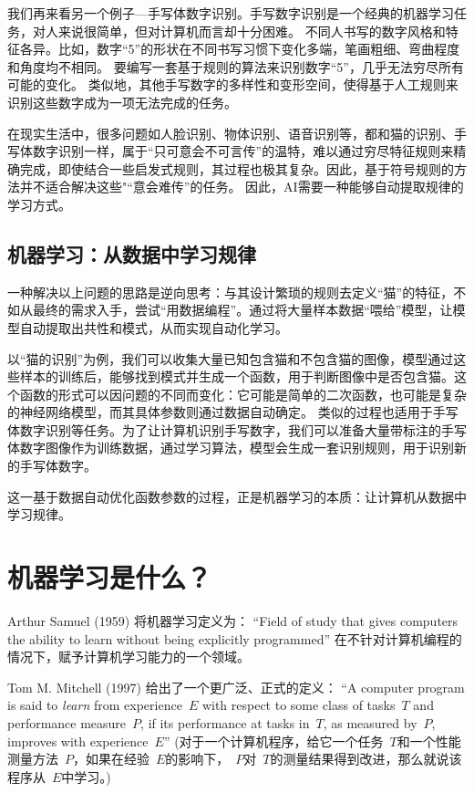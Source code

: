 我们再来看另一个例子---手写体数字识别。手写数字识别\cite{LeCun et al., 1998}是一个经典的机器学习任务，对人来说很简单，但对计算机而言却十分困难。
不同人书写的数字风格和特征各异。比如，数字“5”的形状在不同书写习惯下变化多端，笔画粗细、弯曲程度和角度均不相同。
要编写一套基于规则的算法来识别数字“5”，几乎无法穷尽所有可能的变化。
类似地，其他手写数字的多样性和变形空间，使得基于人工规则来识别这些数字成为一项无法完成的任务。

在现实生活中，很多问题如人脸识别、物体识别、语音识别等，都和猫的识别、手写体数字识别一样，属于“只可意会不可言传”的温特，难以通过穷尽特征规则来精确完成，即使结合一些启发式规则，其过程也极其复杂。因此，基于符号规则的方法并不适合解决这些"“意会难传”的任务。
因此，AI需要一种能够自动提取规律的学习方式。

\subsection{机器学习：从数据中学习规律}
一种解决以上问题的思路是逆向思考：与其设计繁琐的规则去定义“猫”的特征，不如从最终的需求入手，尝试“用数据编程”。通过将大量样本数据“喂给”模型，让模型自动提取出共性和模式，从而实现自动化学习。

以“猫的识别”为例，我们可以收集大量已知包含猫和不包含猫的图像，模型通过这些样本的训练后，能够找到模式并生成一个函数，用于判断图像中是否包含猫。这个函数的形式可以因问题的不同而变化：它可能是简单的二次函数，也可能是复杂的神经网络模型，而其具体参数则通过数据自动确定。
类似的过程也适用于手写体数字识别等任务。为了让计算机识别手写数字，我们可以准备大量带标注的手写体数字图像作为训练数据，通过学习算法，模型会生成一套识别规则，用于识别新的手写体数字。

这一基于数据自动优化函数参数的过程，正是机器学习的本质：让计算机从数据中学习规律。

\section{机器学习是什么？}

Arthur Samuel (1959) 将机器学习定义为：
“Field of study that gives computers the ability to learn without being explicitly programmed”
在不针对计算机编程的情况下，赋予计算机学习能力的一个领域。

Tom M. Mitchell (1997) 给出了一个更广泛、正式的定义：
“A computer program is said to {\em learn} from experience~$ E$ with respect to some class of tasks~$T$ and performance measure~$P$, if its performance at tasks in~$T$, as measured by~$P$, improves with experience~$E$”
(对于一个计算机程序，给它一个任务~$T$和一个性能测量方法~$P$，如果在经验~$E$的影响下，~$P$对~$T$的测量结果得到改进，那么就说该程序从~$E$中学习。)

